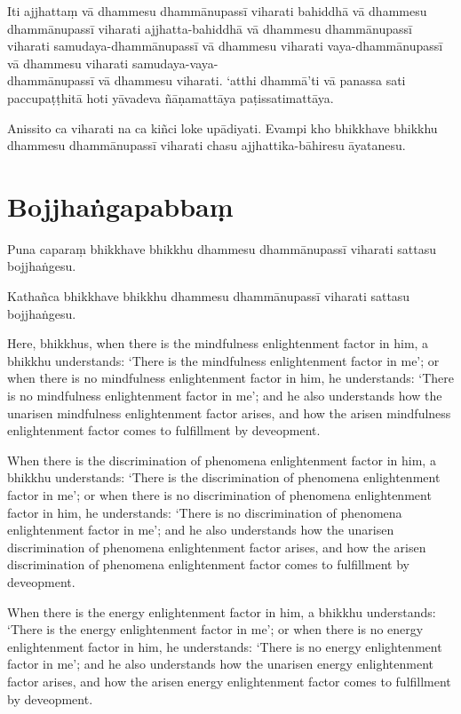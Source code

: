 Iti ajjhattaṃ vā dhammesu dhammānupassī viharati bahiddhā vā dhammesu
dhammānupassī viharati ajjhatta-bahiddhā vā dhammesu dhammānupassī viharati
samudaya-dhammānupassī vā dhammesu viharati vaya-dhammānupassī vā dhammesu
viharati samudaya-vaya-\\
dhammānupassī vā dhammesu viharati. `atthi dhammā'ti vā
panassa sati paccupaṭṭhitā hoti yāvadeva ñāṇamattāya paṭissatimattāya.

Anissito ca viharati na ca kiñci loke upādiyati. Evampi kho bhikkhave bhikkhu
dhammesu dhammānupassī viharati chasu ajjhattika-bāhiresu āyatanesu.


\section*{Bojjhaṅgapabbaṃ}

Puna caparaṃ bhikkhave bhikkhu dhammesu dhammānupassī viharati sattasu
bojjhaṅgesu.

Kathañca bhikkhave bhikkhu dhammesu dhammānupassī viharati sattasu bojjhaṅgesu.

\englishPage

Here, bhikkhus, when there is the mindfulness enlightenment factor in him, a
bhikkhu understands: `There is the mindfulness enlightenment factor in me'; or
when there is no mindfulness enlightenment factor in him, he understands: `There
is no mindfulness enlightenment factor in me'; and he also understands how the
unarisen mindfulness enlightenment factor arises, and how the arisen mindfulness
enlightenment factor comes to fulfillment by deveopment.

When there is the discrimination of phenomena enlightenment factor in him, a
bhikkhu understands: `There is the discrimination of phenomena enlightenment
factor in me'; or when there is no discrimination of phenomena enlightenment
factor in him, he understands: `There is no discrimination of phenomena
enlightenment factor in me'; and he also understands how the unarisen
discrimination of phenomena enlightenment factor arises, and how the arisen
discrimination of phenomena enlightenment factor comes to fulfillment by
deveopment.

When there is the energy enlightenment factor in him, a bhikkhu understands:
`There is the energy enlightenment factor in me'; or when there is no energy
enlightenment factor in him, he understands: `There is no energy enlightenment
factor in me'; and he also understands how the unarisen energy enlightenment
factor arises, and how the arisen energy enlightenment factor comes to
fulfillment by deveopment.

